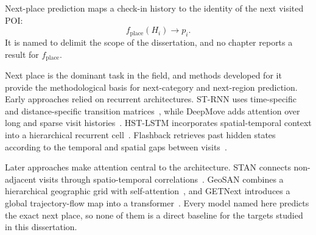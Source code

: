 \begin{definition}\label{def:fund:nextplace}
Next-place prediction maps a check-in history to the identity of the next visited POI:
\begin{equation}
    f_{\mathrm{place}}(H_i)\longrightarrow p_i.
\end{equation}
It is named to delimit the scope of the dissertation, and no chapter reports a result
for $f_{\mathrm{place}}$.
\end{definition}

Next place is the dominant task in the field, and methods developed for it provide the
methodological basis for next-category and next-region prediction. Early approaches
relied on recurrent architectures. ST-RNN uses time-specific and distance-specific
transition matrices~\cite{liu2016strnn}, while DeepMove adds attention over long and
sparse visit histories~\cite{feng2018deepmove}. HST-LSTM incorporates
spatial-temporal context into a hierarchical recurrent cell~\cite{kong2018hstlstm}.
Flashback retrieves past hidden states according to the temporal and spatial gaps
between visits~\cite{yang2020flashback}.

Later approaches make attention central to the architecture. STAN connects
non-adjacent visits through spatio-temporal correlations~\cite{luo2021stan}. GeoSAN
combines a hierarchical geographic grid with self-attention~\cite{lian2020geosan}, and
GETNext introduces a global trajectory-flow map into a
transformer~\cite{yang2022getnext}. Every model named here predicts the exact next
place, so none of them is a direct baseline for the targets studied in this dissertation.

